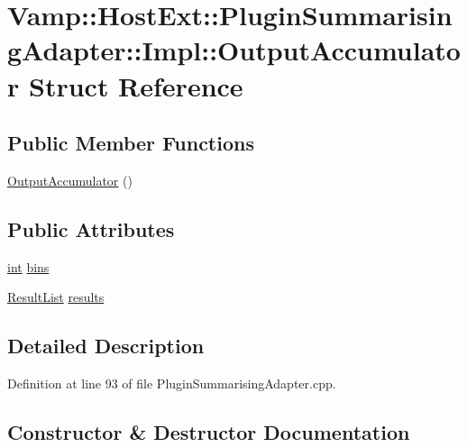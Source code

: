 \hypertarget{struct_vamp_1_1_host_ext_1_1_plugin_summarising_adapter_1_1_impl_1_1_output_accumulator}{}\section{Vamp\+:\+:Host\+Ext\+:\+:Plugin\+Summarising\+Adapter\+:\+:Impl\+:\+:Output\+Accumulator Struct Reference}
\label{struct_vamp_1_1_host_ext_1_1_plugin_summarising_adapter_1_1_impl_1_1_output_accumulator}
\subsection*{Public Member Functions}
\begin{DoxyCompactItemize}
\item 
\hyperlink{struct_vamp_1_1_host_ext_1_1_plugin_summarising_adapter_1_1_impl_1_1_output_accumulator_aa3c2a28643a158724c8514f5dd215adf}{Output\+Accumulator} ()
\end{DoxyCompactItemize}
\subsection*{Public Attributes}
\begin{DoxyCompactItemize}
\item 
\hyperlink{xmltok_8h_a5a0d4a5641ce434f1d23533f2b2e6653}{int} \hyperlink{struct_vamp_1_1_host_ext_1_1_plugin_summarising_adapter_1_1_impl_1_1_output_accumulator_af59eb459fd961200367e6a20a2a27a2a}{bins}
\item 
\hyperlink{class_vamp_1_1_host_ext_1_1_plugin_summarising_adapter_1_1_impl_ac42707318aa1472c3c88d573a23ba6b2}{Result\+List} \hyperlink{struct_vamp_1_1_host_ext_1_1_plugin_summarising_adapter_1_1_impl_1_1_output_accumulator_ad2b9fb1175792aba19748080ff9318af}{results}
\end{DoxyCompactItemize}


\subsection{Detailed Description}


Definition at line 93 of file Plugin\+Summarising\+Adapter.\+cpp.



\subsection{Constructor \& Destructor Documentation}

